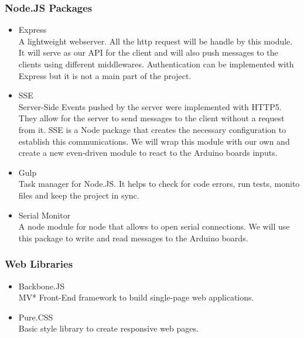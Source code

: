 \documentclass[a4paper]{article}
\begin{document}
\subsubsection {Node.JS Packages}

\begin {itemize}

\item[Express] \hfill \\ 
A lightweight webserver. All the http request will be handle by this module. It will serve as our API for the client and will also push messages to the clients using different middlewares. Authentication can be implemented with Express but it is not a main part of the project.

\item[SSE] \hfill \\ 
Server-Side Events pushed by the server were implemented with HTTP5. They allow for the server to send messages to the client without a request from it. SSE is a Node package that creates the necessary configuration to establish this communications. We will wrap this module with our own and create a new even-driven module to react to the Arduino boards inputs.

\item[Gulp] \hfill \\ 
Task manager for Node.JS. It helps to check for code errors, run tests, monito files and keep the project in sync.

\item[Serial Monitor] \hfill \\ 
A node module for node that allows to open serial connections. We will use this package to write and read messages to the Arduino boards.

\end {itemize}

\subsubsection {Web Libraries}

\begin {itemize}

\item[Backbone.JS] \hfill \\ 
MV* Front-End framework to build single-page web applications.
\item[Pure.CSS] \hfill \\ 
Basic style library to create responsive web pages.

\end {itemize}
\end{document}
